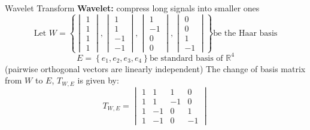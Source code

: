 \documentclass{beamer}
\begin{document}
\begin{frame}[t]{Wavelet Transform}
    \textbf{Wavelet:} compress long signals into smaller ones
    \[
    \text{Let } W = 
    \left
    \{
    \begin{vmatrix}
      1 \\
      1 \\
      1 \\
      1 
    \end{vmatrix}
    ,
    \begin{vmatrix}
      1 \\
      1 \\
     -1 \\
     -1 
    \end{vmatrix}
    ,
    \begin{vmatrix}
      1 \\
     -1 \\
      0 \\
      0
    \end{vmatrix}
    ,
    \begin{vmatrix}
      0 \\
      0 \\
      1 \\
     -1
    \end{vmatrix}
    \right
    \}
    \text{be the Haar basis}
    \]
    \[
    E = \left\{e_1, e_2, e_3, e_4 \right\} \text{be standard basis of }  \mathbb{R}^4
    \]
    \normalsize
    (pairwise orthogonal vectors are linearly independent)\newline
    \pause
    The change of basis matrix from $W$ to $E$, $T_{W,E}$ is given by:
    \[T_{W,E} = 
        \begin{vmatrix}
            1 & 1 & 1 & 0 \\
            1 & 1 & -1 & 0\\
            1 & -1 & 0 & 1\\
            1 & -1 & 0 & -1 
          \end{vmatrix}
    \]
\end{frame} 
\end{document}
